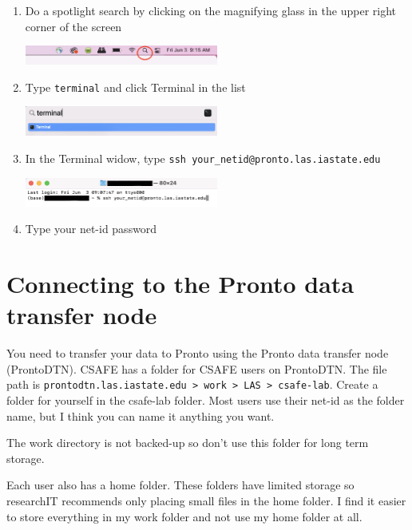 \documentclass[
]{book}
\providecommand{\tightlist}{%
  \setlength{\itemsep}{0pt}\setlength{\parskip}{0pt}}
\begin{document}
\begin{enumerate}
\def\labelenumi{\arabic{enumi}.}
\tightlist
\item
  Do a spotlight search by clicking on the magnifying glass in the upper right corner of the screen

  \includegraphics[width=0.5\textwidth,height=0.5\textheight]{images/spotlight.png}
\item
  Type \texttt{terminal} and click Terminal in the list

  \includegraphics[width=0.5\textwidth,height=0.5\textheight]{images/search_terminal.png}
\item
  In the Terminal widow, type \texttt{ssh\ your\_netid@pronto.las.iastate.edu}

  \includegraphics[width=0.5\textwidth,height=0.5\textheight]{images/mac_terminal.png}
\item
  Type your net-id password
\end{enumerate}

\hypertarget{prontodtn}{%
\section{Connecting to the Pronto data transfer node}\label{prontodtn}}

You need to transfer your data to Pronto using the Pronto data transfer node (ProntoDTN). CSAFE has a folder for CSAFE users on ProntoDTN. The file path is \texttt{prontodtn.las.iastate.edu\ \textgreater{}\ work\ \textgreater{}\ LAS\ \textgreater{}\ csafe-lab}. Create a folder for yourself in the csafe-lab folder. Most users use their net-id as the folder name, but I think you can name it anything you want.

The work directory is not backed-up so don't use this folder for long term storage.

Each user also has a home folder. These folders have limited storage so researchIT recommends only placing small files in the home folder. I find it easier to store everything in my work folder and not use my home folder at all.
\end{document}
